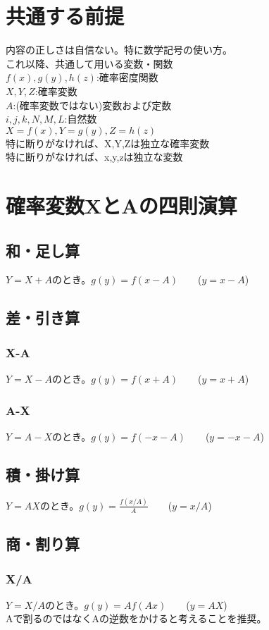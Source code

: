 \documentclass[a4paper,11pt]{ltjsarticle}
\begin{document}
\tableofcontents
\newpage



\section{共通する前提}
内容の正しさは自信ない。特に数学記号の使い方。\\

これ以降、共通して用いる変数・関数\\
$f(x), g(y), h(z)$:確率密度関数\\
$X, Y, Z$:確率変数\\
$A$:(確率変数ではない)変数および定数\\
$i,j,k,N,M,L$:自然数\\
$X=f(x), Y=g(y), Z=h(z)$\\
特に断りがなければ、X,Y,Zは独立な確率変数\\
特に断りがなければ、x,y,zは独立な変数
\newpage


\section{確率変数XとAの四則演算}
\subsection{和・足し算}
$Y=X+A$のとき。$g(y) = f(x-A)$\ \ \ \ ($y=x-A$)
\subsection{差・引き算}
\subsubsection{X-A}
$Y=X-A$のとき。$g(y) = f(x+A)$\ \ \ \ ($y=x+A$)
\subsubsection{A-X}
$Y=A-X$のとき。$g(y) = f(-x-A)$\ \ \ \ ($y=-x-A$)
\subsection{積・掛け算}
$Y=AX$のとき。$g(y) = \frac{f(x/A)}{A}$\ \ \ \ ($y=x/A$)
\subsection{商・割り算}
\subsubsection{X/A}
$Y=X/A$のとき。$g(y) = Af(Ax)$\ \ \ \ ($y=AX$)\\
Aで割るのではなくAの逆数をかけると考えることを推奨。
\end{document}
